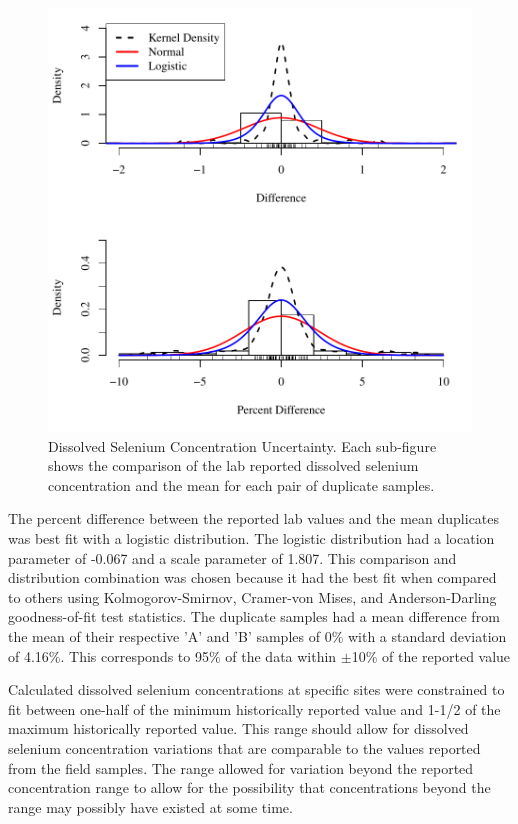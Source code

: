 \begin{linenumbers}
\begin{figure}[htbp]
\begin{center}
	\includegraphics[width=6in]{"Figures/Results_USR/CSe Error"}
	\caption[Dissolved Selenium Concentration Uncertainty.]{Dissolved Selenium Concentration Uncertainty.  Each sub-figure shows the comparison of the lab reported dissolved selenium concentration and the mean for each pair of duplicate samples.}
	\label{fig:CSe uncertainty}
\end{center}
\end{figure}

The percent difference between the reported lab values and the mean duplicates was best fit with a logistic distribution.  The logistic distribution had a location parameter of -0.067 and a scale parameter of 1.807.  This comparison and distribution combination was chosen because it had the best fit when compared to others using Kolmogorov-Smirnov, Cramer-von Mises, and Anderson-Darling goodness-of-fit test statistics.  The duplicate samples had a mean difference from the mean of their respective 'A' and 'B' samples of 0\% with a standard deviation of 4.16\%.  This corresponds to 95\% of the data within $\pm$10\% of the reported value

Calculated dissolved selenium concentrations at specific sites were constrained to fit between one-half of the minimum historically reported value and 1-1/2 of the maximum historically reported value.  This range should allow for dissolved selenium concentration variations that are comparable to the values reported from the field samples.  The range allowed for variation beyond the reported concentration range to allow for the possibility that concentrations beyond the range may possibly have existed at some time.


\end{linenumbers}
